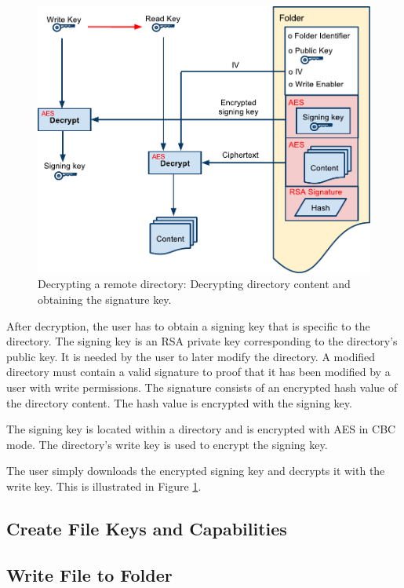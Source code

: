 \documentclass[english,12pt,a4paper]{book}
\begin{document}
\begin{figure}[h!]
    \centering
    \includegraphics[width=\columnwidth]{OpenFolder.pdf}
    \caption{Decrypting a remote directory: Decrypting directory content and
    obtaining the signature key.}
    \label{fig:CS:OD}
\end{figure}

After decryption, the user has to obtain a signing key that is specific to the
directory. The signing key is an RSA private key corresponding to the
directory's public key. It is needed by the user to later modify the directory.
A modified directory must contain a valid signature to proof that it has been
modified by a user with write permissions. The signature consists of an encrypted 
hash value of the directory content. The hash value is encrypted with the
signing key.

The signing key is located within a directory and is encrypted with AES in CBC
mode. The directory's write key is used to encrypt the signing key.

The user simply downloads the encrypted signing key and decrypts it with the
write key. This is illustrated in Figure \ref{fig:CS:OD}.


\subsection{Create File Keys and Capabilities}

\subsection{Write File to Folder}
\end{document}
